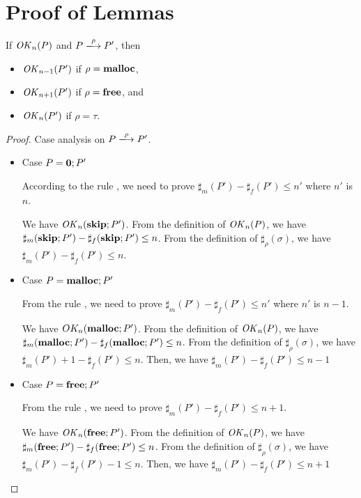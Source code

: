 \section{Proof of Lemmas}
\label{sec:proof}

\begin{lemma}
\label{lem:okPreserved}
If \(\mathit{OK}_n(P)\) and \(P \xlongrightarrow{\rho} P'\), then
\begin{itemize}
\item \(\mathit{OK}_{n-1}(P')\) if \(\rho = \mathbf{malloc}\),
\item \(\mathit{OK}_{n+1}(P')\) if \(\rho = \mathbf{free}\), and
\item \(\mathit{OK}_n(P')\) if \(\rho = \tau\).
\end{itemize}
\end{lemma}
\begin{proof}

Case analysis on \(P \xlongrightarrow{\rho} P'\).

\begin{itemize}
\item Case $P = \mathbf{0};P'$

According to the rule , we need to prove
$\sharp_{m}(P')-\sharp_{f}(P') \le n'$ where $n'$ is $n$.

We have \(\mathit{OK}_n(\mathbf{skip};P')\). From the definition of \(\mathit{OK}_n(P)\), we
have \( \sharp_{m}(\mathbf{skip};P') - \sharp_{f}(\mathbf{skip};P') \le n\). From the
definition of \(\sharp_{\rho}(\sigma)\), we have \(\sharp_{m}(P') -
\sharp_{f}(P') \le n\).

\item Case $P = \mathbf{malloc};P'$

From the rule , we need to prove \(\sharp_{m}(P') -
\sharp_{f}(P') \le n'\) where \(n'\) is \(n - 1\). 

 We have\(\ OK_{n}(\mathbf{malloc};P')\). From the definition of \(\mathit{OK}_n(P)\),
 we have \(\sharp_{m}(\mathbf{malloc};P') - \sharp_{f}(\mathbf{malloc};P') \le
 n\). From the definition of \(\sharp_{\rho}(\sigma)\), we have
 \( \sharp_{m}(P') + 1 - \sharp_{f}(P') \le n\). Then, we
 have \( \sharp_{m}(P') - \sharp_{f}(P') \le n-1\)

\item Case $P = \mathbf{free};P'$

From the rule , we need to prove \(\sharp_{m}(P') - \sharp_{f}(P') \le n+1\).

We have \(\mathit{OK}_{n}(\mathbf{free};P')\). From the definition of \(\mathit{OK}_n(P)\),
we have \(\sharp_{m}(\mathbf{free};P') - \sharp_{f}(\mathbf{free};P') \le n\). From
the definition of \(\sharp_{\rho}(\sigma)\), we have \(\sharp_{m}(P')
- \sharp_{f}(P') - 1 \le n\). Then, we have \(
\sharp_{m}(P') - \sharp_{f}(P') \le n+1\)


\end{itemize}
\end{proof}

